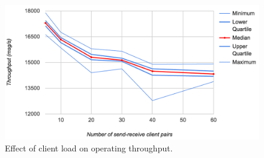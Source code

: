 \begin{figure}
  \centering\includegraphics[width=\textwidth]{../transcripts/lipsum/throughp_clients.png}
  \caption{Effect of client load on operating throughput.}
  \label{fig:summary}
\end{figure}
